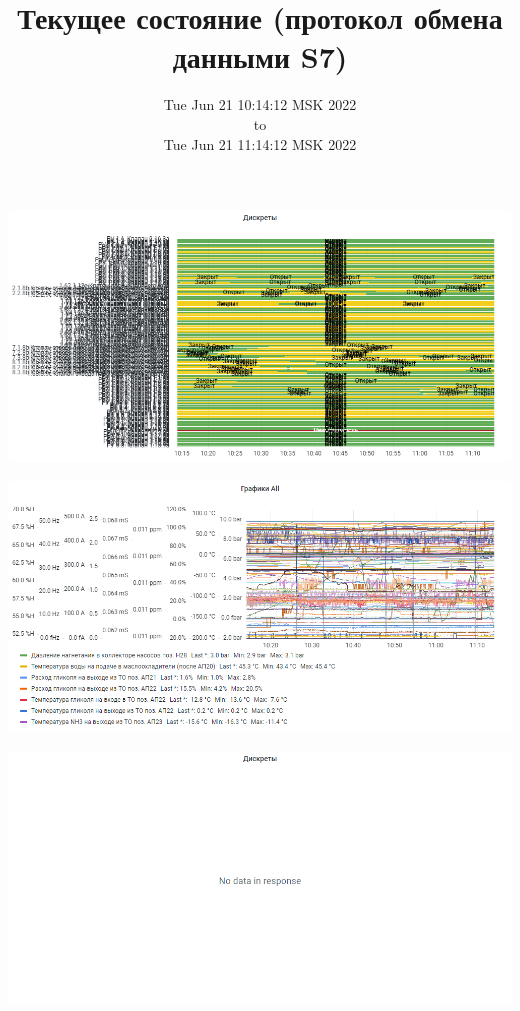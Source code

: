 \documentclass{article}
\begin{document}
\title{Текущее состояние (протокол обмена данными S7)  }
\date{Tue Jun 21 10:14:12 MSK 2022\\to\\Tue Jun 21 11:14:12 MSK 2022}
\maketitle
\begin{center}
\par
\vspace{0.5cm}
\includegraphics[width=\textwidth]{image15}
\par
\vspace{0.5cm}
\par
\vspace{0.5cm}
\includegraphics[width=\textwidth]{image12}
\par
\vspace{0.5cm}
\par
\vspace{0.5cm}
\includegraphics[width=\textwidth]{image154}

\end{center}
\end{document}
